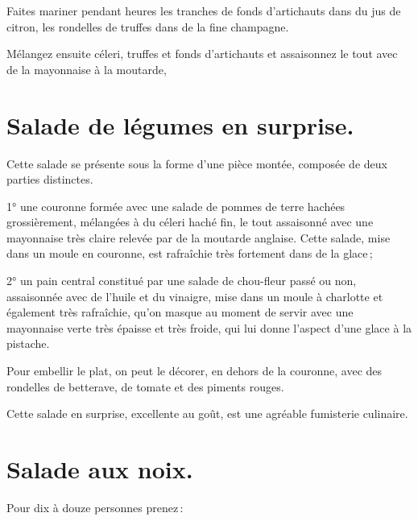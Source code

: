 Faites mariner pendant {\mmm} heures les tranches de fonds d'artichauts
dans du jus de citron, les rondelles de truffes dans de la fine champagne.

Mélangez ensuite céleri, truffes et fonds d'artichauts et assaisonnez le tout avec
de la mayonnaise à la moutarde,

\section*{\centering Salade de légumes en surprise.}
{}

Cette salade se présente sous la forme d'une pièce montée, composée de deux
parties distinctes.

1° une couronne formée avec une salade de pommes de terre hachées
grossièrement, mélangées à du céleri haché fin, le tout assaisonné avec une
mayonnaise très claire relevée par de la moutarde anglaise. Cette salade, mise
dans un moule en couronne, est rafraîchie très fortement dans de la glace ;

2° un pain central constitué par une salade de chou-fleur passé ou non,
assaisonnée avec de l'huile et du vinaigre, mise dans un moule à charlotte et
également très rafraîchie, qu'on masque au moment de servir avec une mayonnaise
verte très épaisse et très froide, qui lui donne l'aspect d’une glace à la
pistache.

Pour embellir le plat, on peut le décorer, en dehors de la couronne, avec des
rondelles de betterave, de tomate et des piments rouges.

Cette salade en surprise, excellente au goût, est une agréable fumisterie
culinaire.

\section*{\centering Salade aux noix.}
{}

Pour dix à douze personnes prenez :

